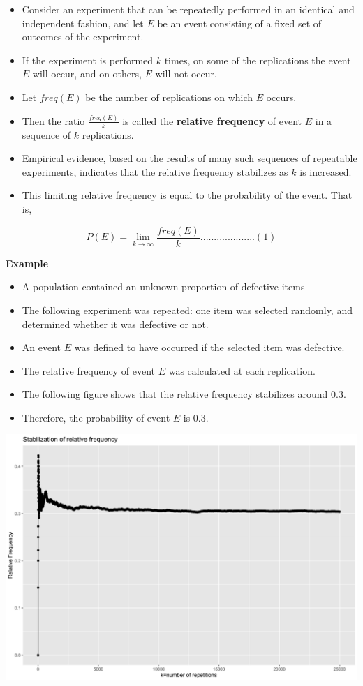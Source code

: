 \documentclass[]{book}
\providecommand{\tightlist}{%
  \setlength{\itemsep}{0pt}\setlength{\parskip}{0pt}}
\begin{document}
\begin{itemize}
\tightlist
\item
  Consider an experiment that can be repeatedly performed in an identical and independent fashion, and let \(E\) be an event consisting of a ﬁxed set of outcomes of the experiment.
\item
  If the experiment is performed \(k\) times, on some of the replications the event \(E\) will occur, and on others, \(E\) will not occur.\\
\item
  Let \(freq (E)\) be the number of replications on which \(E\) occurs.
\item
  Then the ratio \(\frac{freq (E)}k\) is called the \textbf{relative frequency} of event \(E\) in a sequence of \(k\) replications.
\item
  Empirical evidence, based on the results of many such sequences of repeatable experiments, indicates that the relative frequency stabilizes as \(k\) is increased.
\item
  This limiting relative frequency is equal to the probability of the event. That is,
\end{itemize}

\[P(E) = \lim \limits_{k \to \infty}\frac{freq(E)}{k}....................(1)\]

\textbf{Example}

\begin{itemize}
\tightlist
\item
  A population contained an unknown proportion of defective items
\item
  The following experiment was repeated: one item was selected randomly, and determined whether it was defective or not.
\item
  An event \(E\) was defined to have occurred if the selected item was defective.
\item
  The relative frequency of event \(E\) was calculated at each replication.
\item
  The following figure shows that the relative frequency stabilizes around 0.3.
\item
  Therefore, the probability of event \(E\) is 0.3.
\end{itemize}

\begin{center}\includegraphics[width=0.9\linewidth]{figure/rfrq-1} \end{center}
\end{document}
